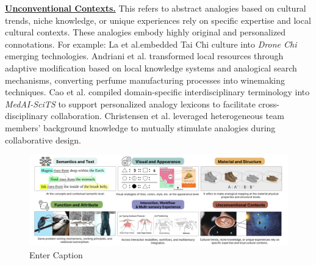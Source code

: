 \textbf{\underline{Unconventional Contexts.}} This refers to abstract analogies based on cultural trends, niche knowledge, or unique experiences rely on specific expertise and local cultural contexts. These analogies embody highly original and personalized connotations. For example: La et al.embedded Tai Chi culture into \textit{Drone Chi} emerging technologies\cite{la2020designing}. Andriani et al. transformed local resources through adaptive modification based on local knowledge systems and analogical search mechanisms, converting perfume manufacturing processes into winemaking techniques\cite{andriani2025perfume}. Cao et al. compiled domain-specific interdisciplinary terminology into \textit{MedAI-SciTS} to support personalized analogy lexicons to facilitate cross-disciplinary collaboration\cite{cao2025medai}. Christensen et al. leveraged heterogeneous team members' background knowledge to mutually stimulate analogies during collaborative design\cite{christensen2016creative}.



\begin{figure}
    \centering
    \includegraphics[width=1\linewidth]{Figures/representation.png}
    \caption{Enter Caption}
    \label{fig:Representation}
\end{figure}